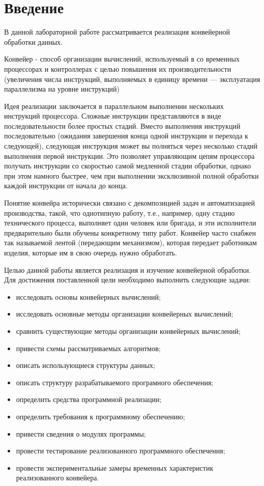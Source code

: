 \chapter*{Введение}

В данной лабораторной работе рассматривается реализация кон­вейерной обработки данных.

Конвейер\cite{pipeline} - способ организации вычислений, используемый в со­
временных процессорах и контроллерах с целью повышения их произ­водительности 
(увеличения числа инструкций, выполняемых в единицу
времени — эксплуатация параллелизма на уровне инструкций)

Идея реализации заключается в параллельном выполне­нии
нескольких инструкций процессора. Сложные инструкции представ­ляются 
в виде последовательности более простых стадий. Вместо выполнения 
инструкций последовательно (ожидания завершения конца одной
инструкции и перехода к следующей), следующая инструкция может вы­
полняться через несколько стадий выполнения первой инструкции. Это
позволяет управляющим цепям процессора получать инструкции со ско­ростью 
самой медленной стадии обработки, однако при этом намного
быстрее, чем при выполнении эксклюзивной полной обработки каждой
инструкции от начала до конца.
	
Понятие конвейра исторически связано с декомпозицией задач и
автоматизацией производства, такой, что однотипную работу, т.е., напри­мер,
 одну стадию технического процесса, выполняет один человек или
бригада, и эти исполнители предварительно были обучены конкретному
типу работ. Конвейер часто снабжен так называемой лентой (передающим 
механизмом), которая передает работникам изделия, которые им в свою 
очередь нужно обработать\cite{parallell}.

Целью данной работы является реализация и изучение конвейерной обработки.
Для достижения поставленной цели необходимо выполнить следующие задачи:
\begin{itemize}
	\item исследовать основы конвейерных вычислений;
	\item исследовать основные методы организации конвейерных вычислений;
	\item сравнить существующие методы организации конвейерных вычислений;
	\item привести схемы рассматриваемых алгоритмов;
	\item описать использующиеся структуры данных;
	\item описать структуру разрабатываемого програмного обеспечения;
	\item определить средства программной реализации;
	\item определить требования к программному обеспечению;
	\item привести сведения о модулях программы;
	\item провести тестирование реализованного программного обеспечения;
	\item провести экспериментальные замеры временных характеристик реализованного конвейера.
\end{itemize}




